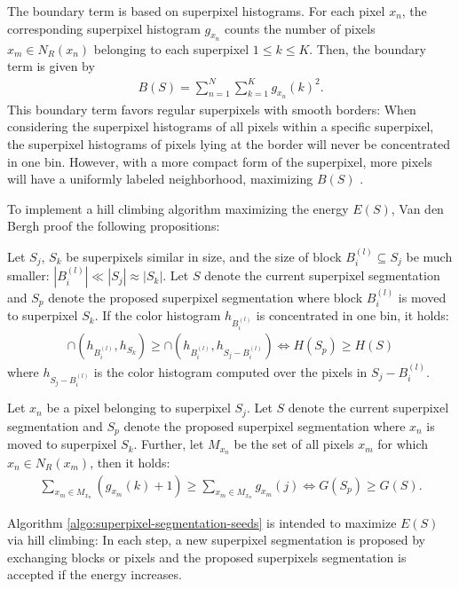 The boundary term is based on superpixel histograms. For each pixel $x_n$, the corresponding superpixel histogram $g_{x_n}$ counts the number of pixels $x_m \in N_R(x_n)$ belonging to each superpixel $1 \leq k \leq K$. Then, the boundary term is given by
\begin{align}
	B(S) = \sum_{n = 1}^N \sum_{k = 1} ^K g_{x_n}(k)^2.
\end{align}
This boundary term favors regular superpixels with smooth borders: When considering the superpixel histograms of all pixels within a specific superpixel, the superpixel histograms of pixels lying at the border will never be concentrated in one bin. However, with a more compact form of the superpixel, more pixels will have a uniformly labeled neighborhood, maximizing $B(S)$ \cite{VanDenBerghBoixRoigCapitaniVanGool:2012}.

To implement a hill climbing algorithm maximizing the energy $E(S)$, Van den Bergh \etal proof the following propositions:
\begin{prop}
	\label{prop:superpixel-segmentation-seeds-prop-1}
	Let $S_j$, $S_k$ be superpixels similar in size, and the size of block $B_i^{(l)} \subseteq S_j$ be much smaller: $|B_i^{(l)}| \ll |S_j| \approx |S_k|$. Let $S$ denote the current superpixel segmentation and $S_p$ denote the proposed superpixel segmentation where block $B_i^{(l)}$ is moved to superpixel $S_k$. If the color histogram $h_{B_i^{(l)}}$ is concentrated in one bin, it holds:
	\begin{align}
		\cap (h_{B_i^{(l)}}, h_{S_k}) \geq \cap (h_{B_i^{(l)}}, h_{S_j - B_i^{(l)}}) \Leftrightarrow H(S_p) \geq H(S)
	\end{align}
	where $h_{S_j - B_i^{(l)}}$ is the color histogram computed over the pixels in $S_j - B_i^{(l)}$.
\end{prop}
\begin{prop}
	\label{prop:superpixel-segmentation-seeds-prop-2}
	Let $x_n$ be a pixel belonging to superpixel $S_j$. Let $S$ denote the current superpixel segmentation and $S_p$ denote the proposed superpixel segmentation where $x_n$ is moved to superpixel $S_k$. Further, let $M_{x_n}$ be the set of all pixels $x_m$ for which $x_n \in N_R(x_m)$, then it holds:
	\begin{align}
		\sum_{x_m \in M_{x_n}} (g_{x_m}(k) + 1) \geq \sum_{x_m \in M_{x_n}} g_{x_m}(j) \Leftrightarrow G(S_p) \geq G(S).
	\end{align}
\end{prop}
\noindent Algorithm \ref{algo:superpixel-segmentation-seeds} is intended to maximize $E(S)$ via hill climbing: In each step, a new superpixel segmentation is proposed by exchanging blocks or pixels and the proposed superpixels segmentation is accepted if the energy increases.

